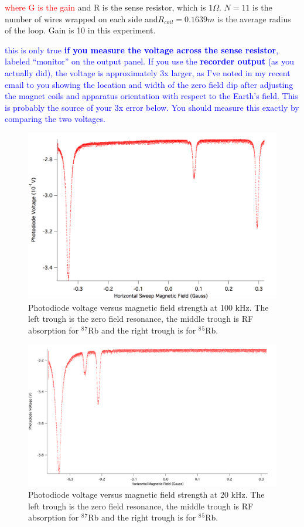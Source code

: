 \documentclass[prb,preprint]{revtex4-1}
\begin{document}
\textcolor{red}{where G is the gain} and R is the sense resistor, which is $1 \Omega$. $N=11$ is the number of wires wrapped on each side and$R_{coil}=0.1639m$ is the average radius of the loop. Gain is 10 in this experiment. 

\textcolor{blue}{this is only true \textbf{if you measure the voltage across the sense resistor}, labeled ``monitor'' on the output panel. If you use the \textbf{recorder output} (as you actually did), the voltage is approximately 3x larger, as I've noted in my recent email to you showing the location and width of the zero field dip after adjusting the magnet coils and apparatus orientation with respect to the Earth's field. This is probably the source of your 3x error below. You should measure this exactly by comparing the two voltages.}  \\

\begin{figure}[h]
\centering
\includegraphics[width=16cm]{100kHz.png}
\caption{Photodiode voltage versus magnetic field strength at 100 kHz. The left trough is the zero field resonance, the middle trough is RF absorption for $^8$$^7$Rb and the right trough is for $^8$$^5$Rb.}
\label{100kHz}
\end{figure}


\begin{figure}[h]
\centering
\includegraphics[width=16cm]{20kHz.png}
\caption{Photodiode voltage versus magnetic field strength at 20 kHz. The left trough is the zero field resonance, the middle trough is RF absorption for $^8$$^7$Rb and the right trough is for $^8$$^5$Rb.}
\label{20kHz}
\end{figure}
\end{document}
